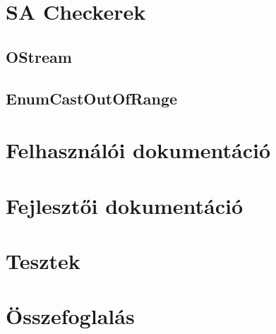 \documentclass[a4paper,12pt]{report}
\begin{document}
\chapter{SA Checkerek}
\section{OStream}
\section{EnumCastOutOfRange}

\chapter{Felhasználói dokumentáció}
\chapter{Fejlesztői dokumentáció}

\chapter{Tesztek}
\chapter{Összefoglalás}
\end{document}

